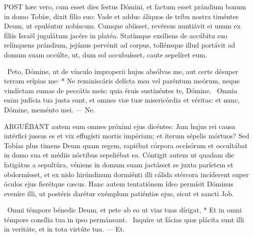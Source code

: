 


\lettrine[lines=2]{P}{OST} hæc vero, cum esset dies festus Dómini, et factum esset prándium bonum in domo Tobíæ, dixit fílio suo: Vade et adduc áliquos de tribu nostra timéntes Deum, ut epuléntur nobíscum. Cumque abíisset, revérsus nuntiávit ei unum ex fíliis Israël jugulátum jacére in platéa. Statímque exsíliens de accúbitu suo relínquens prándium, jejúnus pervénit ad corpus, tollénsque illud portávit ad domum suam occúlte, ut, dum sol occubuísset, caute sepelíret eum.

\R\ Peto, Dómine, ut de vínculo improperii hujus absólvas me, aut certe désuper terram erípias me: * Ne reminiscáris delícta mea vel paréntum meórum, neque vindíctam sumas de peccátis meis: quia éruis sustinéntes te, Dómine. \V\ Omnia enim judícia tua justa sunt, et omnes viæ tuæ misericórdia et véritas: et nunc, Dómine, meménto mei. — Ne.


\lettrine[lines=2]{A}{RGUÉBANT} autem eum omnes próximi ejus dicéntes: Jam hujus rei causa intérfici jussus es et vix effugísti mortis impérium; et íterum sépelis mórtuos? Sed Tobías plus timens Deum quam regem, rapiébat córpora occísórum et occultábat in domo sua et médiis nóctibus sepeliébat ea. Cóntigit autem ut quadam die fatigátus a sepultúra, véniens in domum suam jactásset se juxta paríetem et obdormísset, et ex nido hirúndinum dormiénti illi cálida stércora incíderent super óculos ejus fierétque cæcus. Hanc autem tentatiónem ídeo permísit Dóminus eveníre illi, ut postéris darétur exémplum patiéntiæ ejus, sicut et sancti Job.

\R\ Omni témpore bénedic Deum, et pete ab eo ut vias tuas dírigat, * Et in omni témpore consília tua in ipso permáneant. \V\ Inquíre ut fácias quæ plácita sunt illi in veritáte, et in tota virtúte tua. — Et.

